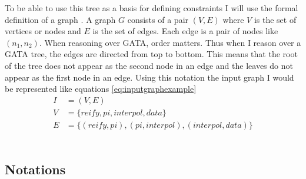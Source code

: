 \documentclass{article}
\begin{document}
To be able to use this tree as a basis for defining constraints I will use the formal definition of a graph \cite{trudeau2013introduction}.  A graph $G$ consists of a pair $(V,E)$ where $V$ is the set of vertices or nodes and $E$ is the set of edges. Each edge is a pair of nodes like $(n_1, n_2)$. When reasoning over GATA, order matters. Thus when I reason over a GATA tree, the edges are directed from top to bottom. This means that the root of the tree does not appear as the second node in an edge and the leaves do not appear as the first node in an edge. 
Using this notation the input graph I would be represented like equations \ref{eq:inputgraphexample}
 \begin{align}
     I &= (V,E) \nonumber \\
     V &= \{reify,pi,interpol, data\} \nonumber \\
     E &= \{(reify,pi), (pi,interpol), (interpol,data)\} \label{eq:inputgraphexample}
 \end{align}
\\ %






\subsection{Notations}
\end{document}
